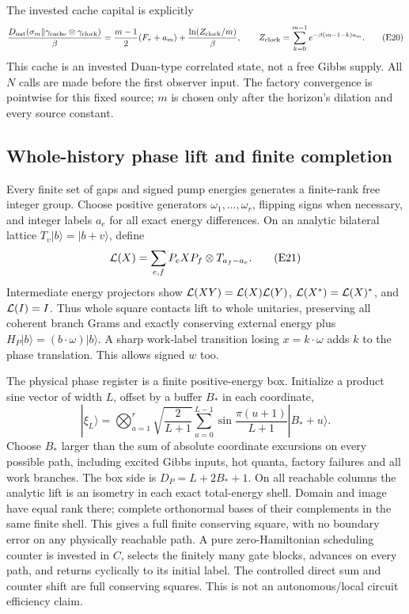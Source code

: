 \documentclass[11pt]{article}
\theoremstyle{definition}
\theoremstyle{remark}
\providecommand{\D}{D_{\mathrm{nat}}}
\begin{document}
The invested cache capital is explicitly
\[
 \frac{\D(\sigma_m\|\gamma_{\rm cache}\otimes\gamma_{\rm clock})}{\beta}
 =\frac{m-1}{2}(F_\tau+a_m)
   +\frac{\ln(Z_{\rm clock}/m)}{\beta},\qquad
 Z_{\rm clock}=\sum_{k=0}^{m-1}e^{-\beta(m-1-k)a_m}.                \tag{E20}
\]
This cache is an invested Duan-type correlated state, not a free
Gibbs supply. All \(N\) calls are made before the first observer input.
The factory convergence is pointwise for this fixed source; \(m\)
is chosen only after the horizon's dilation and every source constant.

\subsection{Whole-history phase lift and finite completion}
Every finite set of gaps and signed pump energies generates a
finite-rank free integer group. Choose positive generators
\(\omega_1,\ldots,\omega_r\), flipping signs when necessary, and integer
labels \(a_e\) for all exact energy differences.
On an analytic bilateral lattice \(T_v|b\rangle=|b+v\rangle\), define
\[
 {\cal L}(X)=\sum_{e,f}P_eXP_f\otimes T_{a_f-a_e}.     \tag{E21}
\]
Intermediate energy projectors show
\({\cal L}(XY)={\cal L}(X){\cal L}(Y)\),
\({\cal L}(X^*)={\cal L}(X)^*\), and \({\cal L}(I)=I\).
Thus whole square contacts lift to whole unitaries, preserving all
coherent branch Grams and exactly conserving external energy plus
\(H_P|b\rangle=(b\cdot\omega)|b\rangle\).
A sharp work-label transition losing \(x=k\cdot\omega\) adds \(k\)
to the phase translation. This allows signed \(w\) too.

The physical phase register is a finite positive-energy box.
Initialize a product sine vector of width \(L\), offset by a buffer
\(B_*\) in each coordinate,
\[
 |\xi_L\rangle=\bigotimes_{a=1}^r
 \sqrt{\frac2{L+1}}\sum_{u=0}^{L-1}
 \sin\frac{\pi(u+1)}{L+1}|B_*+u\rangle.
\]
Choose \(B_*\) larger than the sum of absolute coordinate excursions
on every possible path, including excited Gibbs inputs, hot
quanta, factory failures and all work branches. The box side is
\(D_P=L+2B_*+1\).
On all reachable columns the analytic lift is an isometry in each
exact total-energy shell. Domain and image have equal rank there;
complete orthonormal bases of their complements in the same finite
shell. This gives a full finite conserving square, with no boundary
error on any physically reachable path.
A pure zero-Hamiltonian scheduling counter is invested in \(C\), selects the
finitely many gate blocks, advances on every path, and returns
cyclically to its initial label. The controlled direct sum and counter
shift are full conserving squares. This is not an autonomous/local
circuit efficiency claim.
\end{document}
